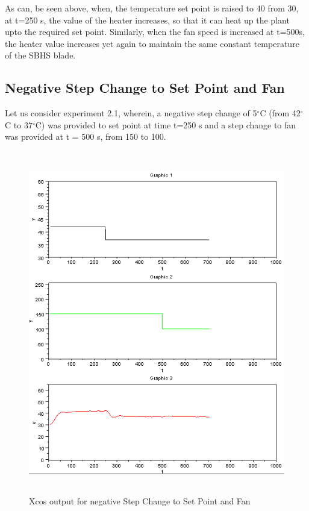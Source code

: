 As can, be seen above, when, the temperature set point is raised to 40 from 30, at t=250 s, the value of the heater increases, so that it can heat up the plant upto the required set point. Similarly, when the fan speed is increased at t=500s, the heater value increases yet again to maintain the same constant temperature of the SBHS blade. 


\subsection{Negative Step Change to Set Point and Fan}
Let us consider experiment 2.1, wherein, a negative step change of 5$^\circ$C (from 42$^\circ$C to 37$^\circ$C) was provided to set point at time t=250 s and a step change to fan was provided at t = 500 s, from 150 to 100. 
\begin{figure}[H]
  \includegraphics[width=12cm, height=15cm]{mpc/2_1.PNG}
  \caption{Xcos output for negative Step Change to Set Point and Fan}
\end{figure}
